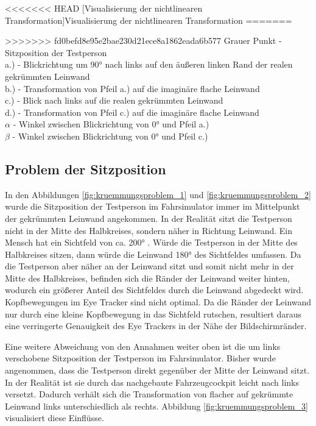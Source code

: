 \begin{center}
\begin{tikzpicture}
		\end{tikzpicture}
<<<<<<< HEAD
		[Visualisierung der nichtlinearen Transformation]{Visualisierung der nichtlinearen Transformation}
=======
		\caption[]{Visualisierung der nichtlinearen Transformation}
>>>>>>> fd0befd8e95e2bae230d21ece8a1862eada6b577
		\captionsetup{justification=justified, singlelinecheck=false}
		{\footnotesize Grauer Punkt - Sitzposition der Testperson\\
		a.) - Blickrichtung um 90° nach links auf den äußeren linken Rand der realen gekrümmten Leinwand\\
		b.) - Transformation von Pfeil a.) auf die imaginäre flache Leinwand\\
		c.) - Blick nach links auf die realen gekrümmten Leinwand\\
		d.) - Transformation von Pfeil c.) auf die imaginäre flache Leinwand\\
		$\alpha$ - Winkel zwischen Blickrichtung von 0° und Pfeil a.)\\
		$\beta$ - Winkel zwischen Blickrichtung von 0° und Pfeil c.)} \label{fig:kruemmungsproblem_2}
\end{center}




\subsection{Problem der Sitzposition}

In den Abbildungen \ref{fig:kruemmungsproblem_1} und \ref{fig:kruemmungsproblem_2} wurde die Sitzposition der Testperson im Fahrsimulator immer im Mittelpunkt der gekrümmten Leinwand angekommen. In der Realität sitzt die Testperson nicht in der Mitte des Halbkreises, sondern näher in Richtung Leinwand. Ein Mensch hat ein Sichtfeld von ca. 200° \cite{lit_website_doccheck_fov}. Würde die Testperson in der Mitte des Halbkreises sitzen, dann würde die Leinwand 180° des Sichtfeldes umfassen. Da die Testperson aber näher an der Leinwand sitzt und somit nicht mehr in der Mitte des Halbkreises, befinden sich die Ränder der Leinwand weiter hinten, wodurch ein größerer Anteil des Sichtfeldes durch die Leinwand abgedeckt wird. Kopfbewegungen im Eye Tracker sind nicht optimal. Da die Ränder der Leinwand nur durch eine kleine Kopfbewegung in das Sichtfeld rutschen, resultiert daraus eine verringerte Genauigkeit des Eye Trackers in der Nähe der Bildschirmränder.

Eine weitere Abweichung von den Annahmen weiter oben ist die um links verschobene Sitzposition der Testperson im Fahrsimulator. Bisher wurde angenommen, dass die Testperson direkt gegenüber der Mitte der Leinwand sitzt. In der Realität ist sie durch das nachgebaute Fahrzeugcockpit leicht nach links versetzt. Dadurch verhält sich die Transformation von flacher auf gekrümmte Leinwand links unterschiedlich als rechts. Abbildung \ref{fig:kruemmungsproblem_3} visualisiert diese Einflüsse. 


